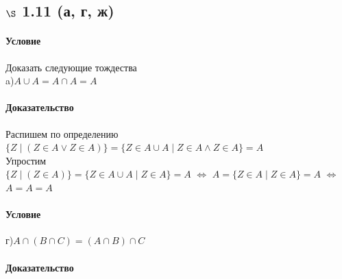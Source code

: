 \documentclass[a4paper,12pt]{article}
\begin{document}
\subsection*{$\S$ 1.11 (а, г, ж)}
\paragraph*{Условие}
Доказать следующие тождества\\
a)$ A \cup A = A \cap A = A $
\paragraph*{Доказательство}
Распишем по определению\\
$\{ Z \mid (Z \in A \vee Z \in A)\} = \{ Z \in A \cup A \mid Z \in A \wedge Z \in A \} = A $\\
Упростим\\
$\{ Z \mid (Z \in A )\} = \{ Z \in A \cup A \mid Z \in A \} = A $ $\Leftrightarrow$ $ A = \{ Z \in A  \mid Z \in A \} = A $  $\Leftrightarrow$ $A=A=A$
\paragraph*{Условие}
г)$ A \cap ( B \cap C ) = ( A \cap B ) \cap C$
\paragraph*{Доказательство} \mbox{}\\
\def\firstcircle{(0,0) circle (1.5cm)}
\def\secondcircle{(45:2cm) circle (1.5cm)}
\def\thirdcircle{(0:2cm) circle (1.5cm)}
\end{document}
